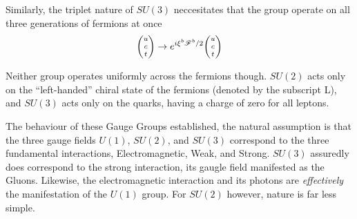     Similarly, the triplet nature of $SU(3)$ neccesitates that the group operate on all three generations of fermions at once
    \begin{equation}
        \minimatrix{u\\c\\t} \to e^{i \xi^b \mathscr{F}^b / 2} \minimatrix{u\\c\\t}
    \end{equation}

    Neither group operates uniformly across the fermions though.
    $SU(2)$ acts only on the ``left-handed'' chiral state of the fermions (denoted by the subscript L),
        and $SU(3)$ acts only on the quarks, having a charge of zero for all leptons.

    The behaviour of these Gauge Groups established, the natural assumption is that the three gauge fields
        $U(1)$, $SU(2)$, and $SU(3)$ correspond to the three fundamental interactions,
        Electromagnetic, Weak, and Strong.
    $SU(3)$ assuredly does correspond to the strong interaction, its gaugle field manifested as the Gluons.
    Likewise, the electromagnetic interaction and its photons are \textit{effectively} the manifestation of the $U(1)$ group. 
    For $SU(2)$ however, nature is far less simple.

    



    
    \cite{Osborn_notes}
    \cite{Peskin_book}
    \cite{Halzen_book}

